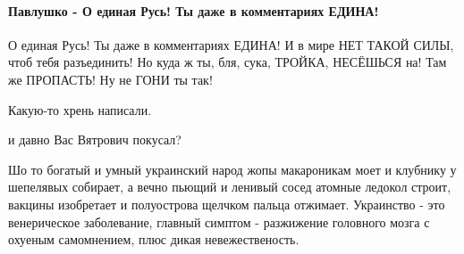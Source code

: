  
 
 
 
 
\paragraph{Павлушко - О единая Русь! Ты даже в комментариях ЕДИНА!}

\begin{itemize}
 

О единая Русь! Ты даже в комментариях ЕДИНА! И в мире НЕТ ТАКОЙ СИЛЫ, чтоб тебя
разъединить! Но куда ж ты, бля, сука, ТРОЙКА, НЕСЁШЬСЯ на! Там же ПРОПАСТЬ! Ну
не ГОНИ ты так!

 
Какую-то хрень написали.

 
и давно Вас Вятрович покусал?

 

Шо то богатый и умный украинский народ жопы макароникам моет и клубнику у
шепелявых собирает, а вечно пьющий и ленивый сосед атомные ледокол строит,
вакцины изобретает и полуострова щелчком пальца отжимает. Украинство - это
венерическое заболевание, главный симптом - разжижение головного мозга с
охуеным самомнением, плюс дикая невежественость.


\end{itemize}
